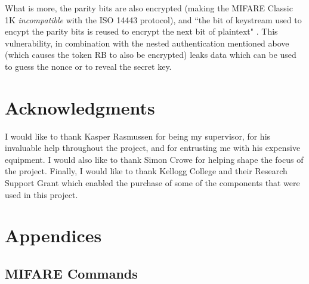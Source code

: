 \documentclass[fleqn,10pt]{SelfArx} %
\begin{document}
What is more, the parity bits are also encrypted (making the MIFARE Classic 1K {\em incompatible} with the ISO 14443 protocol), and ``the bit of keystream used to encypt the parity bits is reused to encrypt the next bit of plaintext" \cite{classicvulnerabilities}. This vulnerability, in combination with the nested authentication mentioned above (which causes the token RB to also be encrypted) leaks data which can be used to guess the nonce or to reveal the secret key.




\section*{Acknowledgments} %

I would like to thank Kasper Rasmussen for being my supervisor, for his invaluable help throughout the project, and for entrusting me with his expensive equipment. I would also like to thank Simon Crowe for helping shape the focus of the project. Finally, I would like to thank Kellogg College and their Research Support Grant which enabled the purchase of some of the components that were used in this project.





\onecolumn
\appendix
\section*{Appendices}
\renewcommand{\thesubsection}{\Alph{subsection}}
\subsection{MIFARE Commands}
\label{app:mifare}
\end{document}
